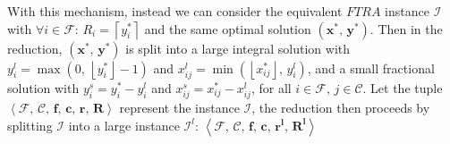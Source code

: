 \documentclass[10pt]{llncs}
\begin{document}
With this mechanism, instead we can consider the equivalent $FTRA$
instance $\mathcal{I}$ with $\forall i\in\mathcal{F}:\, R_{i}=\left\lceil y_{i}^{*}\right\rceil $
and the same optimal solution $\left(\boldsymbol{x^{*}},\,\boldsymbol{y^{*}}\right)$.
Then in the reduction, $\left(\boldsymbol{x^{*}},\,\boldsymbol{y^{*}}\right)$
is split into a large integral solution with $y_{i}^{l}=\max\left(0,\,\left\lfloor y_{i}^{*}\right\rfloor -1\right)$
and $x_{ij}^{l}=\min\left(\left\lfloor x_{ij}^{*}\right\rfloor ,\, y_{i}^{l}\right)$,
and a small fractional solution with $ $$y_{i}^{s}=y_{i}^{*}-y_{i}^{l}$
and $x_{ij}^{s}=x_{ij}^{*}-x_{ij}^{l}$, for all $i\in\mathcal{F},\, j\in\mathcal{C}$.
Let the tuple $\left\langle \mathcal{F},\,\mathcal{C},\,\boldsymbol{f},\,\boldsymbol{c},\,\boldsymbol{r},\,\boldsymbol{R}\right\rangle $
represent the instance $\mathcal{I}$, the reduction then proceeds
by splitting $\mathcal{I}$ into a large instance $ $$\mathcal{I}^{l}$:
$\left\langle \mathcal{F},\,\mathcal{C},\,\boldsymbol{f},\,\boldsymbol{c},\,\boldsymbol{r^{l}},\,\boldsymbol{R^{l}}\right\rangle $
\end{document}
